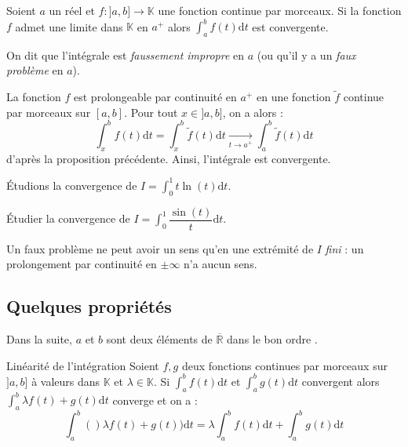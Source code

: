 \documentclass[french,11pt,twoside]{VcCours}
\newcommand{\dt}{\text{d}t}
\begin{document}
\begin{Proposition}{} Soient $a$ un réel et $f : ]a,b] \rightarrow \mathbb{K}$ une fonction continue par morceaux. Si la fonction $f$ admet une limite dans $\mathbb{K}$ en $a^{+}$ alors $\int_{a}^b f(t) \dt$ est convergente.

On dit que l'intégrale est \emph{faussement impropre} en $a$ (ou qu'il y a un \emph{faux problème} en $a$).
\end{Proposition}

\begin{Demonstration}{} La fonction $f$ est prolongeable par continuité en $a^+$ en une fonction $\tilde{f}$ continue par morceaux sur $[a,b]$. Pour tout $x \in ]a,b]$, on a alors :
$$ \int_{x}^b f(t) \dt = \int_{x}^b \tilde{f}(t) \dt \underset{t \rightarrow a^+}{\longrightarrow} \int_{a}^b \tilde{f}(t) \dt$$
d'après la proposition précédente. Ainsi, l'intégrale est convergente.
\end{Demonstration}

\begin{Exemple} Étudions la convergence de $I = \int_{0}^1 t \ln(t) \dt$.


\end{Exemple}
\newpage

\begin{ApplicationDirecte}{} Étudier la convergence de $I = \int_{0}^{1} \dfrac{\sin(t)}{t} \dt$.
\end{ApplicationDirecte}

\begin{Remarque}[\alerte]{} Un faux problème ne peut avoir un sens qu'en une extrémité de $I$ \emph{fini} : un prolongement par continuité en $ \pm \infty$ n'a aucun sens.
\end{Remarque}


\subsection{Quelques propriétés}
Dans la suite, $a$ et $b$ sont deux éléments de $\overline{\mathbb{R}}$ dans \og le bon ordre \fg .

\begin{Proposition}{Linéarité de l'intégration} 
Soient $f,g$ deux fonctions continues par morceaux sur $]a,b]$ à valeurs dans $\mathbb{K}$ et $\lambda \in \mathbb{K}$. Si $\int_{a}^b f(t) \dt$ et $\int_{a}^b g(t) \dt$ convergent alors $\int_{a}^b \lambda f(t) + g(t) \dt$ converge et on a :
$$ \int_{a}^b ()\lambda f(t) + g(t)) \dt = \lambda \int_{a}^b f(t) \dt + \int_{a}^b g(t) \dt$$
\end{Proposition}
\end{document}
